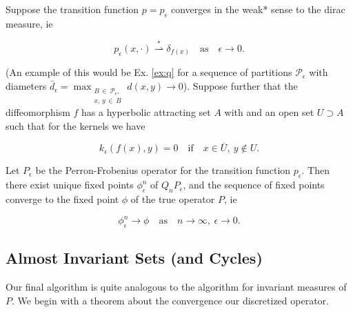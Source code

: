 \begin{proposition}
    \cite*{attr, measure, algGAIO, perturbationsbook, perturbationsart} 
    Suppose the transition function $p = p_\epsilon$ converges in the weak* sense to the 
    dirac measure, ie 

    \begin{equation}
        p_\epsilon (x, \cdot) \overset{*}{\rightharpoonup} \delta_{f(x)} 
        \quad\text{as}\quad \epsilon \to 0.
    \end{equation}

    (An example of this would be Ex. \ref{ex:q} for a sequence of partitions 
    $\mathcal{P}_\epsilon$ with diameters
    $\bar{d}_\epsilon = \max_{\substack{B\, \in\, \mathcal{P}_\epsilon,\\ x,\, y\, \in\, B}} d(x, y) \to 0$).
    Suppose further that the diffeomorphism $f$ has a hyperbolic attracting set $A$ with
    and an open set $U \supset A$ such that for the kernels we have

    \begin{equation}
        k_\epsilon (f(x), y) = 0 \quad\text{if}\quad x \in \overline{U},\ y \notin U.
    \end{equation}

    Let $P_\epsilon$ be the Perron-Frobenius operator for the transition function 
    $p_\epsilon$. Then there exist unique fixed points $\phi_\epsilon^n$ of $Q_n P_\epsilon$, 
    and the sequence of fixed points converge to the fixed point $\phi$ of the true 
    operator $P$, ie

    \begin{equation}
        \phi_\epsilon^n \to \phi 
        \quad\text{as}\quad n \to \infty,\ \epsilon \to 0.
    \end{equation}
\end{proposition}


\subsection{Almost Invariant Sets (and Cycles)}

Our final algorithm is quite analogous to the algorithm for invariant measures of $P$. We 
begin with a theorem about the convergence our discretized operator.

